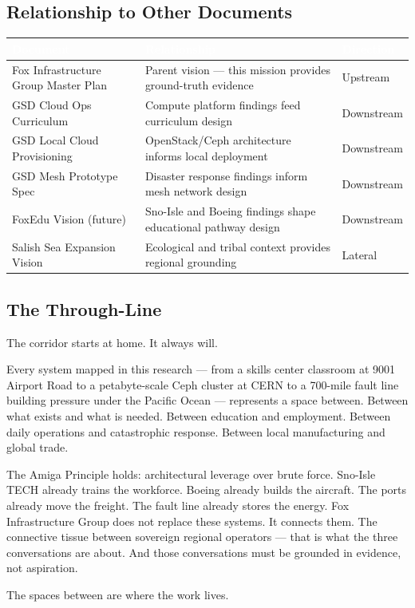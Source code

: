 \documentclass[11pt,letterpaper]{article}
\newcommand{\tableheader}[1]{\textbf{\sffamily\textcolor{white}{#1}}}
\begin{document}
\subsection{Relationship to Other Documents}

\begin{center}
\begin{tabularx}{\textwidth}{L{4cm}XC{2cm}}
\toprule
{}
\tableheader{Document} & \tableheader{Relationship} & \tableheader{Direction} \\
\midrule
Fox Infrastructure Group Master Plan & Parent vision --- this mission provides ground-truth evidence & Upstream \\
GSD Cloud Ops Curriculum & Compute platform findings feed curriculum design & Downstream \\
GSD Local Cloud Provisioning & OpenStack/Ceph architecture informs local deployment & Downstream \\
GSD Mesh Prototype Spec & Disaster response findings inform mesh network design & Downstream \\
FoxEdu Vision (future) & Sno-Isle and Boeing findings shape educational pathway design & Downstream \\
Salish Sea Expansion Vision & Ecological and tribal context provides regional grounding & Lateral \\
\bottomrule
\end{tabularx}
\end{center}

\subsection{The Through-Line}

\begin{quotebox}
The corridor starts at home. It always will.

Every system mapped in this research --- from a skills center classroom at 9001 Airport Road to a petabyte-scale Ceph cluster at CERN to a 700-mile fault line building pressure under the Pacific Ocean --- represents a space between. Between what exists and what is needed. Between education and employment. Between daily operations and catastrophic response. Between local manufacturing and global trade.

The Amiga Principle holds: architectural leverage over brute force. Sno-Isle TECH already trains the workforce. Boeing already builds the aircraft. The ports already move the freight. The fault line already stores the energy. Fox Infrastructure Group does not replace these systems. It connects them. The connective tissue between sovereign regional operators --- that is what the three conversations are about. And those conversations must be grounded in evidence, not aspiration.

The spaces between are where the work lives.
\end{quotebox}
\end{document}
